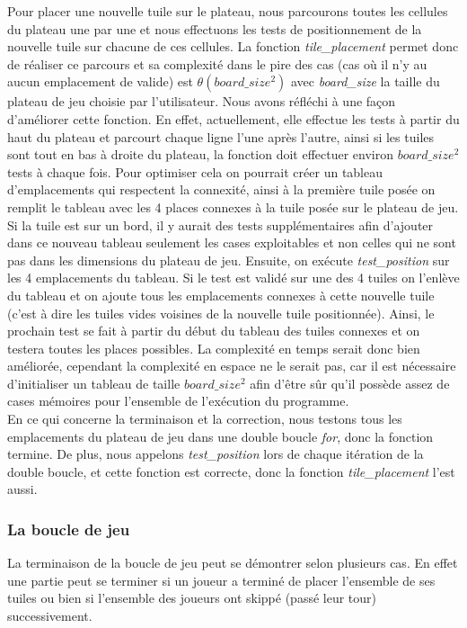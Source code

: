 \documentclass[11pt]{article}
\begin{document}
Pour placer une nouvelle tuile sur le plateau, nous parcourons toutes les cellules du plateau une par une et nous effectuons les tests de positionnement de la nouvelle tuile sur chacune de ces cellules. La fonction \emph{tile\_placement} permet donc de réaliser ce parcours et sa complexité dans le pire des cas (cas où il n'y au aucun emplacement de valide) est \( \theta(board\_size^2) \) avec \emph{board\_size} la taille du plateau de jeu choisie par l'utilisateur. Nous avons réfléchi à une façon d'améliorer cette fonction. En effet, actuellement, elle effectue les tests à partir du haut du plateau et parcourt chaque ligne l'une après l'autre, ainsi si les tuiles sont tout en bas à droite du plateau, la fonction doit effectuer environ \(board\_size^2 \) tests à chaque fois. Pour optimiser cela on pourrait créer un tableau d’emplacements qui respectent la connexité, ainsi à la première tuile posée on remplit le tableau avec les 4 places connexes à la tuile posée sur le plateau de jeu. Si la tuile est sur un bord, il y aurait des tests supplémentaires afin d'ajouter dans ce nouveau tableau seulement les cases exploitables et non celles qui ne sont pas dans les dimensions du plateau de jeu. Ensuite, on exécute \emph{test\_position} sur les 4 emplacements du tableau. Si le test est validé sur une des 4 tuiles on l’enlève du tableau et on ajoute tous les emplacements connexes à cette nouvelle tuile (c’est à dire les tuiles vides voisines de la nouvelle tuile positionnée). Ainsi, le prochain test se fait à partir du début du tableau des tuiles connexes et on testera toutes les places possibles. La complexité en temps serait donc bien améliorée, cependant la complexité en espace ne le serait pas, car il est nécessaire d'initialiser un tableau de taille \(board\_size^2 \) afin d'être sûr qu'il possède assez de cases mémoires pour l'ensemble de l'exécution du programme. \\

En ce qui concerne la terminaison et la correction, nous testons tous les emplacements du plateau de jeu dans une double boucle \emph{for}, donc la fonction termine. De plus, nous appelons \emph{test\_position} lors de chaque itération de la double boucle, et cette fonction est correcte, donc la fonction \emph{tile\_placement} l'est aussi.

\subsubsection{La boucle de jeu}
La terminaison de la boucle de jeu peut se démontrer selon plusieurs cas. En effet une partie peut se terminer si un joueur a terminé de placer l'ensemble de ses tuiles ou bien si l'ensemble des joueurs ont skippé (passé leur tour) successivement. \\
\end{document}
